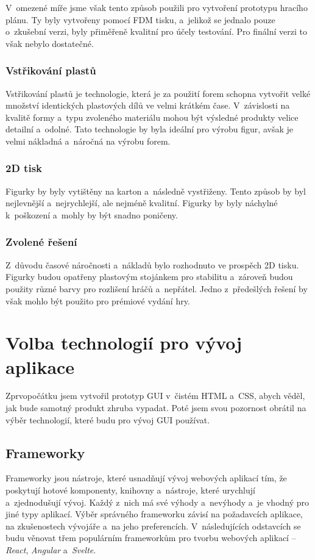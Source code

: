 V~omezené míře jsme však tento způsob použili pro vytvoření prototypu hracího plánu. Ty byly vytvořeny pomocí FDM tisku, a~jelikož se jednalo pouze o~zkušební verzi, byly přiměřeně kvalitní pro účely testování. Pro finální verzi to však nebylo dostatečné.

\subsubsection*{Vstřikování plastů}
Vstřikování plastů je technologie, která je za použití forem schopna vytvořit velké množství identických plastových dílů ve velmi krátkém čase. V~závislosti na kvalitě formy a~typu zvoleného materiálu mohou být výsledné produkty velice detailní a~odolné. Tato technologie by byla ideální pro výrobu figur, avšak je velmi nákladná a~náročná na výrobu forem.

\subsubsection*{2D tisk}
Figurky by byly vytištěny na karton a~následně vystřiženy. Tento způsob by byl nejlevnější a~nejrychlejší, ale nejméně kvalitní. Figurky by byly náchylné k~poškození a~mohly by být snadno poničeny.

\subsubsection*{Zvolené řešení}
Z~důvodu časové náročnosti a~nákladů bylo rozhodnuto ve prospěch 2D tisku. Figurky budou opatřeny plastovým stojánkem pro stabilitu a~zároveň budou použity různé barvy pro rozlišení hráčů a~nepřátel. Jedno z~předešlých řešení by však mohlo být použito pro prémiové vydání hry.

\section{Volba technologií pro vývoj aplikace}
Zprvopočátku jsem vytvořil prototyp GUI v~čistém HTML a~CSS, abych věděl, jak bude samotný produkt zhruba vypadat. Poté jsem svou pozornost obrátil na výběr technologií, které budu pro vývoj GUI používat.

\subsection{Frameworky}
Frameworky jsou nástroje, které usnadňují vývoj webových aplikací tím, že poskytují hotové komponenty, knihovny a~nástroje, které urychlují a~zjednodušují vývoj. Každý z~nich má své výhody a~nevýhody a~je vhodný pro jiné typy aplikací. Výběr správného frameworku závisí na požadavcích aplikace, na zkušenostech vývojáře a~na jeho preferencích. V~následujících odstavcích se budu věnovat třem populárním frameworkům pro tvorbu webových aplikací -- \textit{React}, \textit{Angular} a~\textit{Svelte}.


